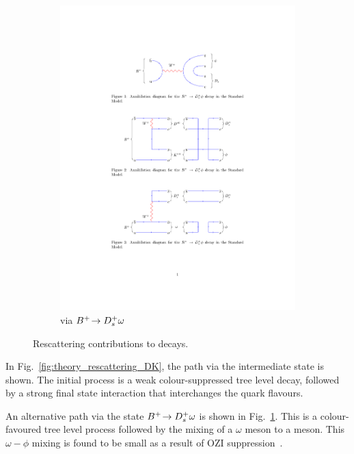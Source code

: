 \begin{figure}[!h]
\begin{subfigure}[m]{0.6\textwidth}
        \includegraphics[width=1.0\textwidth]{figs/Theory/B2DsPhi_Rescattering_B2Dsomega.pdf}
        \caption{via ${{{B}^+}}\!\rightarrow {\ensuremath{{D}^+_{s}}}\omega$}
        \label{fig:theory_rescattering_DsO}
    \end{subfigure}
    \caption{Rescattering contributions to \decay{\Bp}{\Dsp\phiz} decays.}
    \label{fig:Theory_rescattering}   
\end{figure}
In Fig.~\ref{fig:theory_rescattering_DK}, the path via the \decay{\Bp}{\Dstarz\Kstarp} intermediate state is shown. The initial process is a weak colour-suppressed tree level decay, followed by a strong final state interaction that interchanges the quark flavours. 

An alternative path via the state ${{{B}^+}}\!\rightarrow {\ensuremath{{D}^+_{s}}}\omega$ is shown in Fig.~\ref{fig:theory_rescattering_DsO}. This is a colour-favoured tree level process followed by the mixing of a $\omega$ meson to a \phiz meson. This $\omega-\phi$ mixing is found to be small as a result of OZI suppression~\cite{Okubo:1963fa,PhysRevD.79.074006}.


